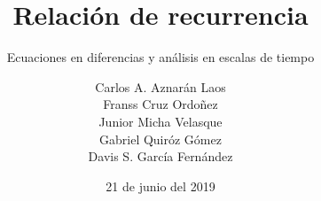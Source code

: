 \documentclass[
	graybox,
	envcountchap,
	sectrefs
]{svmono}
\date{21 de junio del 2019}
\begin{document}
\hypersetup{pageanchor=false}

\author{
	Carlos A. Aznarán Laos\\
	Franss Cruz Ordoñez\\
	Junior Micha Velasque\\
	Gabriel Quiróz Gómez\\
	Davis S. García Fernández
}
\title{Relación de recurrencia}
\subtitle{Ecuaciones en diferencias y análisis en escalas de tiempo}
\maketitle

\frontmatter





\tableofcontents



\hypersetup{pageanchor=true}

\mainmatter

\begingroup
\let\clearpage\relax








\endgroup

\begingroup
\let\clearpage\relax

\endgroup

\begingroup
\let\clearpage\relax



\endgroup

\backmatter

%
%
\printindex
\end{document}
